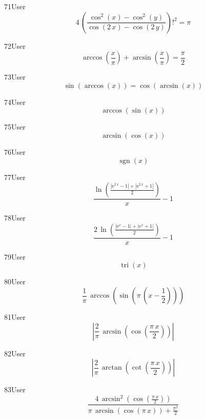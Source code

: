 \begin{espr}{71}{User}{\verificata}
\[
4\, \left(\frac{\cos^{2}\!\left(x\right) - \cos^{2}\!\left(y\right)}{\cos\!\left(2\, x\right) - \cos\!\left(2\, y\right)}\right)!^{2} = \pi
\]
\end{espr}
\begin{espr}{72}{User}{\verificata}
\[
\arccos\!\left(\frac{x}{\pi}\right) + \arcsin\!\left(\frac{x}{\pi}\right) = \frac{\pi}{2}
\]
\end{espr}
\begin{espr}{73}{User}{\verificata}
\[
\sin\!\left(\arccos\!\left(x\right)\right) = \cos\!\left(\arcsin\!\left(x\right)\right)
\]
\end{espr}
\begin{espr}{74}{User}{}
\[
\arccos\!\left(\sin\!\left(x\right)\right)
\]
\end{espr}
\begin{espr}{75}{User}{}
\[
\arcsin\!\left(\cos\!\left(x\right)\right)
\]
\end{espr}
\begin{espr}{76}{User}{}
\[
\operatorname{sgn}\!\left(x\right)
\]
\end{espr}
\begin{espr}{77}{User}{}
\[
\frac{\ln\!\left(\frac{\left|\mathrm{e}^{2\, x} - 1\right| + \left|\mathrm{e}^{2\, x} + 1\right|}{2}\right)}{x} - 1
\]
\end{espr}
\begin{espr}{78}{User}{}
\[
\frac{2\, \ln\!\left(\frac{\left|\mathrm{e}^{x} - 1\right| + \left|\mathrm{e}^{x} + 1\right|}{2}\right)}{x} - 1
\]
\end{espr}
\begin{espr}{79}{User}{}
\[
\operatorname{tri}\!\left(x\right)
\]
\end{espr}
\begin{espr}{80}{User}{}
\[
\frac{1}{\pi}\, \arccos\!\left(\sin\!\left(\pi\, \left(x - \frac{1}{2}\right)\right)\right)
\]
\end{espr}
\begin{espr}{81}{User}{}
\[
\left|\frac{2}{\pi}\, \arcsin\!\left(\cos\!\left(\frac{\pi\, x}{2}\right)\right)\right|
\]
\end{espr}
\begin{espr}{82}{User}{}
\[
\left|\frac{2}{\pi}\, \arctan\!\left(\cot\!\left(\frac{\pi\, x}{2}\right)\right)\right|
\]
\end{espr}
\begin{espr}{83}{User}{}
\[
\frac{4\, \arcsin^{2}\!\left(\cos\!\left(\frac{\pi\, x}{2}\right)\right)}{\pi\, \arcsin\!\left(\cos\!\left(\pi\, x\right)\right) + \frac{\pi^{2}}{2}}
\]
\end{espr}
